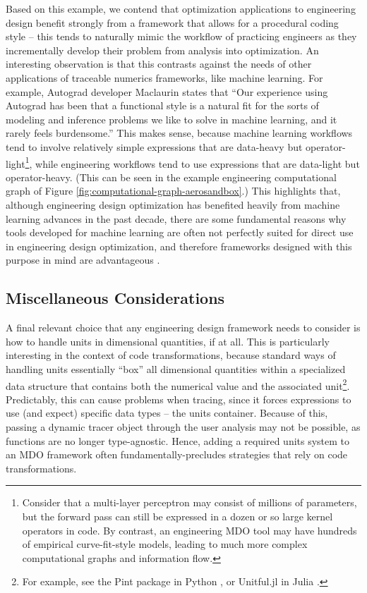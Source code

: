Based on this example, we contend that optimization applications to engineering design benefit strongly from a framework that allows for a procedural coding style -- this tends to naturally mimic the workflow of practicing engineers as they incrementally develop their problem from analysis into optimization. An interesting observation is that this contrasts against the needs of other applications of traceable numerics frameworks, like machine learning. For example, Autograd developer Maclaurin \cite{maclaurin_modeling_2016} states that ``Our experience using Autograd has been that a functional style is a natural fit for the sorts of modeling and inference problems we like to solve in machine learning, and it rarely feels burdensome.'' This makes sense, because machine learning workflows tend to involve relatively simple expressions that are data-heavy but operator-light\footnote{Consider that a multi-layer perceptron may consist of millions of parameters, but the forward pass can still be expressed in a dozen or so large kernel operators in code. By contrast, an engineering MDO tool may have hundreds of empirical curve-fit-style models, leading to much more complex computational graphs and information flow.}, while engineering workflows tend to use expressions that are data-light but operator-heavy. (This can be seen in the example engineering computational graph of Figure \ref{fig:computational-graph-aerosandbox}.) This highlights that, although engineering design optimization has benefited heavily from machine learning advances in the past decade, there are some fundamental reasons why tools developed for machine learning are often not perfectly suited for direct use in engineering design optimization, and therefore frameworks designed with this purpose in mind are advantageous \cite{rackauckas_engineering_2021}.

\subsection{Miscellaneous Considerations}

A final relevant choice that any engineering design framework needs to consider is how to handle units in dimensional quantities, if at all. This is particularly interesting in the context of code transformations, because standard ways of handling units essentially ``box'' all dimensional quantities within a specialized data structure that contains both the numerical value and the associated unit\footnote{For example, see the Pint package in Python \cite{pint}, or Unitful.jl in Julia \cite{unitful}.}. Predictably, this can cause problems when tracing, since it forces expressions to use (and expect) specific data types -- the units container. Because of this, passing a dynamic tracer object through the user analysis may not be possible, as functions are no longer type-agnostic. Hence, adding a required units system to an MDO framework often fundamentally-precludes strategies that rely on code transformations.

